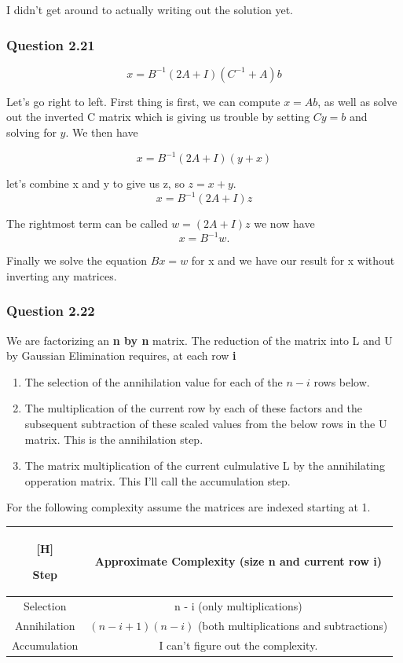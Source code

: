 \documentclass{article}
\begin{document}
{
\color{red} I didn't get around to actually writing out the solution yet.
}

\subsubsection{Question 2.21}
$$x = B^{-1} (2A + I)(C^{-1} + A)b$$

Let's go right to left. First thing is first, we can compute $x = Ab$, as well as
solve out the inverted C matrix which is giving us trouble by setting $Cy = b$ and
solving for $y$. We then have

$$x = B^{-1} (2A + I)(y + x)$$

let's combine x and y to give us z, so $z = x + y$.
$$x = B^{-1} (2A + I)z$$

The rightmost term can be called $w  = (2A + I) z$ we now have
$$x = B^{-1} w.$$

Finally we solve the equation $Bx = w$ for x and we have our result for x without
inverting any matrices.

\subsubsection{Question 2.22}

We are factorizing an \textbf{n by n} matrix. The reduction of the matrix into L and U
by Gaussian Elimination requires, at each row \textbf{i}

\begin{enumerate}
\item The selection of the annihilation value for each of the $n-i$ rows below.
\item The multiplication of the current row by each of these factors and the subsequent subtraction 
of these scaled values from the below rows in the U matrix. This is the annihilation step.
\item The matrix multiplication of the current culmulative L by the annihilating opperation matrix. This I'll call the accumulation step.
\end{enumerate}

For the following complexity assume the matrices are indexed starting at 1.

\begin{flushleft}
\begin{tabular}{c | c}[H]

Step & Approximate Complexity (size n and current row i)\\
\hline
Selection & n - i (only multiplications)\\
Annihilation & $(n-i + 1)(n-i)$ (both multiplications and subtractions)\\
Accumulation & {\color{red}I can't figure out the complexity.}\\
\end{tabular}
\end{flushleft}
\end{document}
